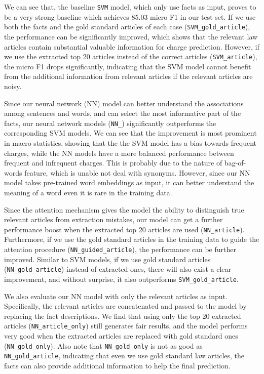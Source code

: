 We can see that, the baseline \texttt{SVM} model, which only use facts as input, proves to be a very strong baseline which achieves 85.03 micro F1 in our test set. If we use both the facts and the gold standard articles of each case (\texttt{SVM\_gold\_article}), the performance can be significantly improved, which shows that the relevant law articles contain substantial valuable information for charge prediction. However, if we use the extracted top 20 articles instead of the correct articles (\texttt{SVM\_article}), the micro F1 drops significantly, indicating that the SVM model cannot benefit from the additional information from relevant articles if the relevant articles are noisy. 

Since our neural network (NN) model can better understand the associations among sentences and words, and can select the most informative part of the facts, our neural network models (\texttt{NN\_}) significantly outperforms the corresponding SVM models. 
We can see that the improvement is most prominent in macro statistics, showing that the the SVM model has a  bias towards frequent charges, while the NN models have a more balanced performance between frequent and infrequent charges. This is probably due to the nature of bag-of-words feature, which is unable not deal with synonyms. However, since our NN model takes pre-trained word embeddings as input, it can better understand the meaning of a word even it is rare in the training data. 

Since the attention mechanism gives the model the ability to distinguish true relevant articles from extraction mistakes, our model can get a further performance boost when the extracted top 20 articles are used (\texttt{NN\_article}). Furthermore, if we use the gold standard articles in the training data to guide the attention procedure (\texttt{NN\_guided\_article}), the performance can be further improved. Similar to SVM models, if we use gold standard articles (\texttt{NN\_gold\_article}) instead of extracted ones, there will also exist a clear improvement, and without surprise, it also outperforms \texttt{SVM\_gold\_article}.

We also evaluate our NN model with only the relevant articles as input. Specifically, the relevant articles are concatenated and passed to the model by replacing the fact descriptions. We find that using only the top 20 extracted articles (\texttt{NN\_article\_only}) still generates fair results, and the model performs very good when the extracted articles are replaced with gold standard ones (\texttt{NN\_gold\_only}). Also note that \texttt{NN\_gold\_only} is not as good as \texttt{NN\_gold\_article}, indicating that even we use gold standard law articles, the facts can also provide additional information to help the final prediction.

